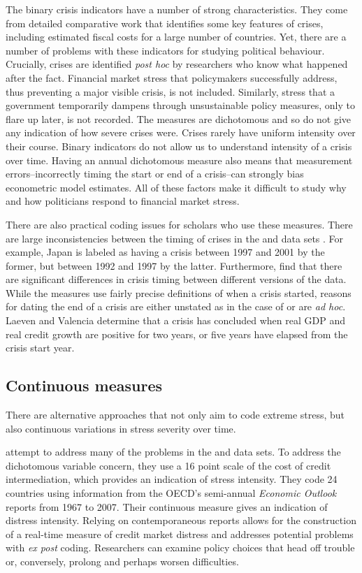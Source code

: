 \documentclass[]{article}
\begin{document}
The binary crisis indicators have a number of strong characteristics. They come from detailed comparative work that identifies some key features of crises, including estimated fiscal costs for a large number of countries. Yet, there are a number of problems with these indicators for studying political behaviour. Crucially, crises are identified \emph{post hoc} by researchers who know what happened after the fact. Financial market stress that policymakers successfully address, thus preventing a major visible crisis, is not included. Similarly, stress that a government temporarily dampens through unsustainable policy measures, only to flare up later, is not recorded. The measures are dichotomous and so do not give any indication of how severe crises were. Crises rarely have uniform intensity over their course. Binary indicators do not allow us to understand intensity of a crisis over time.  Having an annual dichotomous measure also means that measurement errors--incorrectly timing the start or end of a crisis--can strongly bias econometric model estimates. All of these factors make it difficult to study why and how politicians respond to financial market stress.

There are also practical coding issues for scholars who use these measures. There are large inconsistencies between the timing of crises in the \cite{laeven2013} and \cite{Reinhart2009} data sets \citep{Chaudron2014}. For example, Japan is labeled as having a crisis between 1997 and 2001 by the former, but between 1992 and 1997 by the latter. Furthermore, \cite{GandrudHallerberg2015} find that there are significant differences in crisis timing between different versions of the \cite{laeven2013} data. While the measures use fairly precise definitions of when a crisis started, reasons for dating the end of a crisis are either unstated as in the case of \cite{Reinhart2009} or are \emph{ad hoc}. Laeven and Valencia \citeyearpar[footnote 19]{laeven2013} determine that a crisis has concluded when real GDP and real credit growth are positive for two years, or five years have elapsed from the crisis start year.

\subsection{Continuous measures}

There are alternative approaches that not only aim to code extreme stress, but also continuous variations in stress severity over time.

\cite{Romer2015} attempt to address many of the problems in the \cite{Reinhart2009} and \cite{laeven2013} data sets. To address the dichotomous variable concern, they use a 16 point scale of the cost of credit intermediation, which provides an indication of stress intensity. They code 24 countries using information from the OECD's semi-annual \emph{Economic Outlook} reports from 1967 to 2007. Their continuous measure gives an indication of distress intensity. Relying on contemporaneous reports allows for the construction of a real-time measure of credit market distress and addresses potential problems with \emph{ex post} coding. Researchers can examine policy choices that head off trouble or, conversely, prolong and perhaps worsen difficulties.
\end{document}

